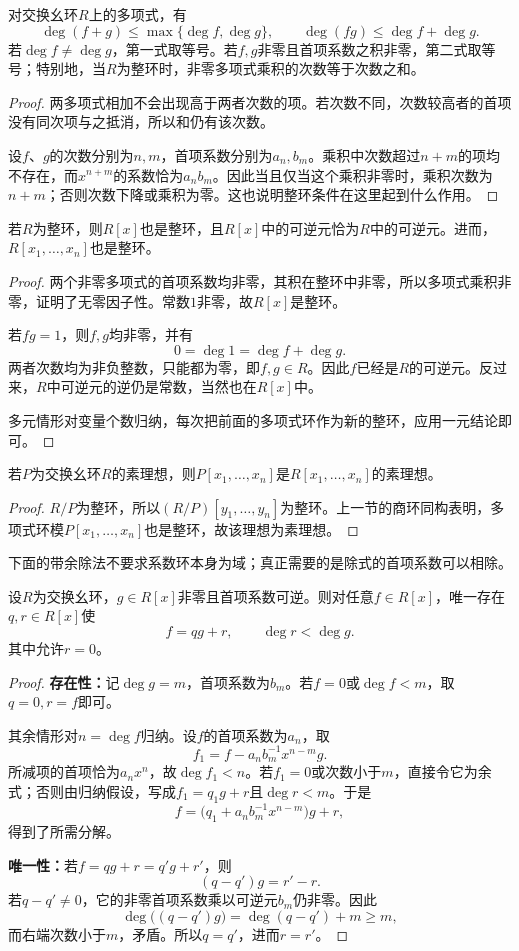 \begin{proposition}
对交换幺环$R$上的多项式，有
\[
\deg(f+g)\le\max\{\deg f,\deg g\},\qquad
\deg(fg)\le\deg f+\deg g.
\]
若$\deg f\ne\deg g$，第一式取等号。若$f,g$非零且首项系数之积非零，第二式取等号；特别地，当$R$为整环时，非零多项式乘积的次数等于次数之和。
\end{proposition}
\begin{proof}
两多项式相加不会出现高于两者次数的项。若次数不同，次数较高者的首项没有同次项与之抵消，所以和仍有该次数。

设$f$、$g$的次数分别为$n,m$，首项系数分别为$a_n,b_m$。乘积中次数超过$n+m$的项均不存在，而$x^{n+m}$的系数恰为$a_nb_m$。因此当且仅当这个乘积非零时，乘积次数为$n+m$；否则次数下降或乘积为零。这也说明整环条件在这里起到什么作用。
\end{proof}

\begin{proposition}
若$R$为整环，则$R[x]$也是整环，且$R[x]$中的可逆元恰为$R$中的可逆元。进而，$R[x_1,\ldots,x_n]$也是整环。
\end{proposition}
\begin{proof}
两个非零多项式的首项系数均非零，其积在整环中非零，所以多项式乘积非零，证明了无零因子性。常数$1$非零，故$R[x]$是整环。

若$fg=1$，则$f,g$均非零，并有
\[
0=\deg1=\deg f+\deg g.
\]
两者次数均为非负整数，只能都为零，即$f,g\in R$。因此$f$已经是$R$的可逆元。反过来，$R$中可逆元的逆仍是常数，当然也在$R[x]$中。

多元情形对变量个数归纳，每次把前面的多项式环作为新的整环，应用一元结论即可。
\end{proof}

\begin{corollary}
若$P$为交换幺环$R$的素理想，则$P[x_1,\ldots,x_n]$是$R[x_1,\ldots,x_n]$的素理想。
\end{corollary}
\begin{proof}
$R/P$为整环，所以$(R/P)[y_1,\ldots,y_n]$为整环。上一节的商环同构表明，多项式环模$P[x_1,\ldots,x_n]$也是整环，故该理想为素理想。
\end{proof}

下面的带余除法不要求系数环本身为域；真正需要的是除式的首项系数可以相除。

\begin{theorem}\label{p2:poly-division}
设$R$为交换幺环，$g\in R[x]$非零且首项系数可逆。则对任意$f\in R[x]$，唯一存在$q,r\in R[x]$使
\[
f=qg+r,\qquad \deg r<\deg g.
\]
其中允许$r=0$。
\end{theorem}
\begin{proof}
\textbf{存在性：}记$\deg g=m$，首项系数为$b_m$。若$f=0$或$\deg f<m$，取$q=0,r=f$即可。

其余情形对$n=\deg f$归纳。设$f$的首项系数为$a_n$，取
\[
f_1=f-a_nb_m^{-1}x^{n-m}g.
\]
所减项的首项恰为$a_nx^n$，故$\deg f_1<n$。若$f_1=0$或次数小于$m$，直接令它为余式；否则由归纳假设，写成$f_1=q_1g+r$且$\deg r<m$。于是
\[
f=\bigl(q_1+a_nb_m^{-1}x^{n-m}\bigr)g+r,
\]
得到了所需分解。

\textbf{唯一性：}若$f=qg+r=q'g+r'$，则
\[
(q-q')g=r'-r.
\]
若$q-q'\ne0$，它的非零首项系数乘以可逆元$b_m$仍非零。因此
\[
\deg\bigl((q-q')g\bigr)=\deg(q-q')+m\ge m,
\]
而右端次数小于$m$，矛盾。所以$q=q'$，进而$r=r'$。
\end{proof}

